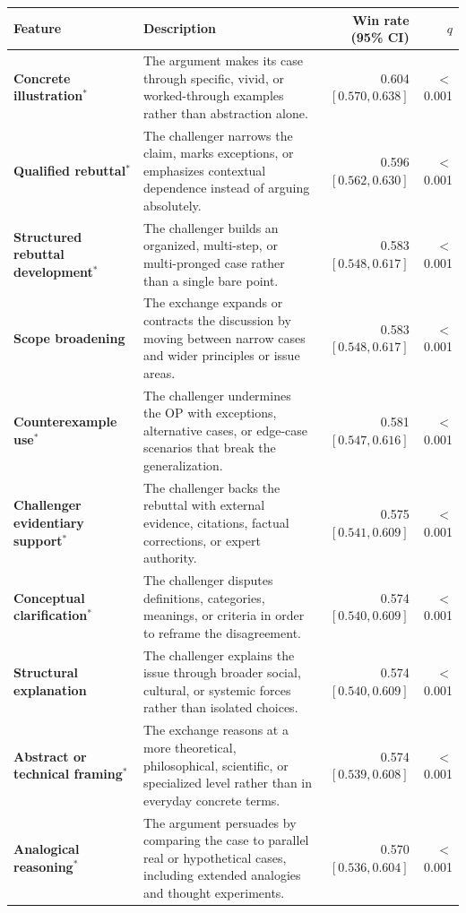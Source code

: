 \begin{tabularx}{\textwidth}{@{}>{\raggedright\arraybackslash}p{} X r r@{}}
\toprule
Feature & Description & Win rate (95\% CI) & $q$ \\
\midrule
\bfseries Concrete illustration$^{*}$ & The argument makes its case through specific, vivid, or worked-through examples rather than abstraction alone. & 0.604 {\tiny$[0.570, 0.638]$} & $<$0.001 \\
\bfseries Qualified rebuttal$^{*}$ & The challenger narrows the claim, marks exceptions, or emphasizes contextual dependence instead of arguing absolutely. & 0.596 {\tiny$[0.562, 0.630]$} & $<$0.001 \\
\bfseries Structured rebuttal development$^{*}$ & The challenger builds an organized, multi-step, or multi-pronged case rather than a single bare point. & 0.583 {\tiny$[0.548, 0.617]$} & $<$0.001 \\
\bfseries Scope broadening & The exchange expands or contracts the discussion by moving between narrow cases and wider principles or issue areas. & 0.583 {\tiny$[0.548, 0.617]$} & $<$0.001 \\
\bfseries Counterexample use$^{*}$ & The challenger undermines the OP with exceptions, alternative cases, or edge-case scenarios that break the generalization. & 0.581 {\tiny$[0.547, 0.616]$} & $<$0.001 \\
\bfseries Challenger evidentiary support$^{*}$ & The challenger backs the rebuttal with external evidence, citations, factual corrections, or expert authority. & 0.575 {\tiny$[0.541, 0.609]$} & $<$0.001 \\
\bfseries Conceptual clarification$^{*}$ & The challenger disputes definitions, categories, meanings, or criteria in order to reframe the disagreement. & 0.574 {\tiny$[0.540, 0.609]$} & $<$0.001 \\
\bfseries Structural explanation & The challenger explains the issue through broader social, cultural, or systemic forces rather than isolated choices. & 0.574 {\tiny$[0.540, 0.609]$} & $<$0.001 \\
\bfseries Abstract or technical framing$^{*}$ & The exchange reasons at a more theoretical, philosophical, scientific, or specialized level rather than in everyday concrete terms. & 0.574 {\tiny$[0.539, 0.608]$} & $<$0.001 \\
\bfseries Analogical reasoning$^{*}$ & The argument persuades by comparing the case to parallel real or hypothetical cases, including extended analogies and thought experiments. & 0.570 {\tiny$[0.536, 0.604]$} & $<$0.001 \\

\end{tabularx}
